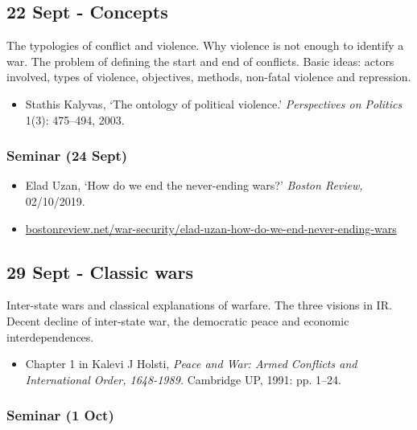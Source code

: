 \documentclass[12pt, a4paper]{article}
\begin{document}
\subsection*{22 Sept - Concepts}

The typologies of conflict and violence. Why violence is not enough to identify a war. The problem of defining the start and end of conflicts. Basic ideas: actors involved, types of violence, objectives, methods, non-fatal violence and repression.

\begin{itemize}
\setlength\itemsep{0pt}
\item Stathis Kalyvas, `The ontology of political violence.' \textit{Perspectives on Politics} 1(3): 475--494, 2003.
\end{itemize}

\subsubsection*{Seminar (24 Sept)}

\begin{itemize}
\setlength\itemsep{-5pt}
\item Elad Uzan, `How do we end the never-ending wars?' \textit{Boston Review,} 02/10/2019.
\item[] \href{https://bostonreview.net/war-security/elad-uzan-how-do-we-end-never-ending-wars}{bostonreview.net/war-security/elad-uzan-how-do-we-end-never-ending-wars}
\end{itemize}

\subsection*{29 Sept - Classic wars}

Inter-state wars and classical explanations of warfare. The three visions in IR. Decent decline of inter-state war, the democratic peace and economic interdependences.

\begin{itemize}
\setlength\itemsep{0pt}
\item Chapter 1 in Kalevi J Holsti, \textit{Peace and War: Armed Conflicts and International Order, 1648-1989.} Cambridge UP, 1991: pp. 1--24.
\end{itemize}

\subsubsection*{Seminar (1 Oct)}
\end{document}
